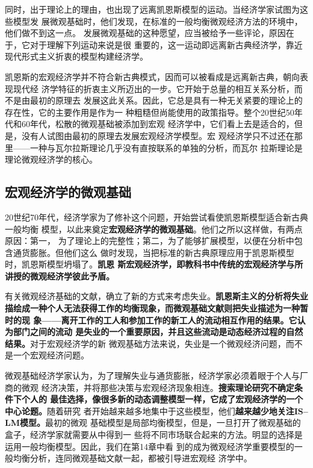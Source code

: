 同时，出于理论上的理由，也出现了远离凯恩斯模型的运动。当经济学家试图为这些模型发
展微观基础时，他们发现，在标准的一般均衡微观经济方法的环境中，他们做不到这一点。
发展微观基础的这种愿望，应当被给予一些评论，原因在于，它对于理解下列运动来说是很
重要的，这一运动即远离新古典经济学，靠近现代形式主义折衷的模型构建经济学。

凯恩斯的宏观经济学并不符合新古典模式，因而可以被看成是远离新古典，朝向表现现代经
济学特征的折衷主义所迈出的一步。它开始于总量的相互关系分析，而不是由最初的原理去
发展这此关系。因此，它总是具有一种无关紧要的理论上的存在性，它的主要作用是作为一
种粗糙但尚能使用的政策指导。整个20世纪50年代和60年代，松散的微观基础被添加到宏观
经济学中，它们看上去是适合的，但是，没有人试图由最初的原理去发展宏观经济学模型。宏
观经济学只不过还在那里——一种与瓦尔拉斯理论几乎没有直按联系的单独的分析，而瓦尔
拉斯理论是理论微观经济学的核心。

\subsection{宏观经济学的微观基础}

20世纪70年代，经济学家为了修补这个问题，开始尝试看使凯恩斯模型适合新古典一般均衡
模型，以此来奠定\textbf{宏观经济学的微观基础}。他们之所以这样做，有两点原因：第一，
为了理论上的完整性；第二，为了能够扩展模型，以便在分析中包含通货膨胀。但他们这么
做时发现，当把标准的新古典原理应用于凯恩斯模型时，凯恩斯模型坍塌了。\textbf{凯恩
  斯宏观经济学，即教科书中传统的宏观经济学与所讲授的微观经济学彼此予盾。}

有关微观经济基础的文献，确立了新的方式来考虑失业。\textbf{凯恩斯主义的分析将失业
  描绘成一种个人无法获得工作的均衡现象，而微观基础文献则把失业描述为一种暂时的现
  象——离开工作的工人和参加工作的新工人的流动相互作用的结果。它认为部门之间的流动
  是失业的一个重要原因，并且这些流动是动态经济过程的自然结果。}对于宏观经济学的新
微观基础方法来说，失业是一个微观经济问题，而不是一个宏观经济问题。

微观基础经济学家认为，为了理解失业与通货膨胀，经济学家必须着眼于个人与厂商的微观
经济决策，并将那些决策与宏观经济现象相连。\textbf{搜索理论研究不确定条件下个人的
  最佳选择，像很多新的动态调整模型一样，它成了宏观经济学的一个中心论题。}随着研究
者开始越来越多地集中于这些模型，他们\textbf{越来越少地关注IS--LM模型。}最初的微观
基础模型是局部均衡模型，但是，一旦打开了微观基础的盒子，经济学家就需要从中得到一
些将不同市场联合起来的方法。明显的选择是运用一般均衡模型。因此，我们在第14章中看
到的成为微观经济学重要模型的一般均衡分析，连同微观基础文献一起，都被引导进宏观经
济学中。

